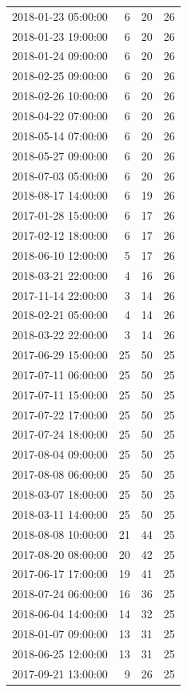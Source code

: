 \begin{tabular}{lrrr}
2018-01-23 05:00:00 & 6 & 20 & 26 \\
2018-01-23 19:00:00 & 6 & 20 & 26 \\
2018-01-24 09:00:00 & 6 & 20 & 26 \\
2018-02-25 09:00:00 & 6 & 20 & 26 \\
2018-02-26 10:00:00 & 6 & 20 & 26 \\
2018-04-22 07:00:00 & 6 & 20 & 26 \\
2018-05-14 07:00:00 & 6 & 20 & 26 \\
2018-05-27 09:00:00 & 6 & 20 & 26 \\
2018-07-03 05:00:00 & 6 & 20 & 26 \\
2018-08-17 14:00:00 & 6 & 19 & 26 \\
2017-01-28 15:00:00 & 6 & 17 & 26 \\
2017-02-12 18:00:00 & 6 & 17 & 26 \\
2018-06-10 12:00:00 & 5 & 17 & 26 \\
2018-03-21 22:00:00 & 4 & 16 & 26 \\
2017-11-14 22:00:00 & 3 & 14 & 26 \\
2018-02-21 05:00:00 & 4 & 14 & 26 \\
2018-03-22 22:00:00 & 3 & 14 & 26 \\
2017-06-29 15:00:00 & 25 & 50 & 25 \\
2017-07-11 06:00:00 & 25 & 50 & 25 \\
2017-07-11 15:00:00 & 25 & 50 & 25 \\
2017-07-22 17:00:00 & 25 & 50 & 25 \\
2017-07-24 18:00:00 & 25 & 50 & 25 \\
2017-08-04 09:00:00 & 25 & 50 & 25 \\
2017-08-08 06:00:00 & 25 & 50 & 25 \\
2018-03-07 18:00:00 & 25 & 50 & 25 \\
2018-03-11 14:00:00 & 25 & 50 & 25 \\
2018-08-08 10:00:00 & 21 & 44 & 25 \\
2017-08-20 08:00:00 & 20 & 42 & 25 \\
2017-06-17 17:00:00 & 19 & 41 & 25 \\
2018-07-24 06:00:00 & 16 & 36 & 25 \\
2018-06-04 14:00:00 & 14 & 32 & 25 \\
2018-01-07 09:00:00 & 13 & 31 & 25 \\
2018-06-25 12:00:00 & 13 & 31 & 25 \\
2017-09-21 13:00:00 & 9 & 26 & 25 \\

\end{tabular}
